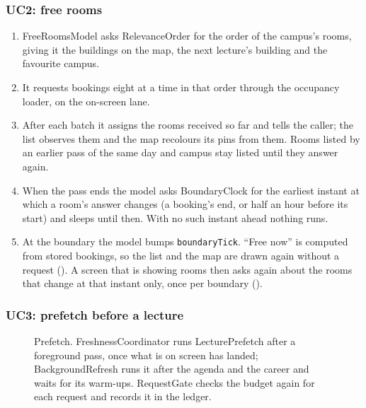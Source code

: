 \subsubsection{UC2: free rooms}
\begin{enumerate}
  \item FreeRoomsModel asks RelevanceOrder for the order of the campus's rooms, giving it the buildings on the map, the next lecture's building and the favourite campus.
  \item It requests bookings eight at a time in that order through the occupancy loader, on the on-screen lane.
  \item After each batch it assigns the rooms received so far and tells the caller; the list observes them and the map recolours its pins from them. Rooms listed by an earlier pass of the same day and campus stay listed until they answer again.
  \item When the pass ends the model asks BoundaryClock for the earliest instant at which a room's answer changes (a booking's end, or half an hour before its start) and sleeps until then. With no such instant ahead nothing runs.
  \item At the boundary the model bumps \texttt{boundaryTick}. ``Free now'' is computed from stored bookings, so the list and the map are drawn again without a request (). A screen that is showing rooms then asks again about the rooms that change at that instant only, once per boundary ().
\end{enumerate}

\subsubsection{UC3: prefetch before a lecture}
\begin{figure}[H]
\centering
{}
\caption{Prefetch. FreshnessCoordinator runs LecturePrefetch after a foreground pass, once what is on screen has landed; BackgroundRefresh runs it after the agenda and the career and waits for its warm-ups. RequestGate checks the budget again for each request and records it in the ledger.}
\end{figure}

